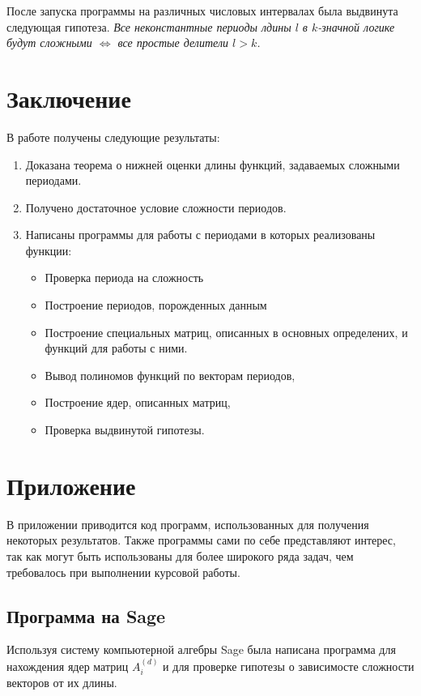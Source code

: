 \documentclass[bibliography=totoc, a4paper, 14pt]{extarticle}
\let\stdsection\section
\renewcommand\section{\newpage\stdsection}
\begin{document}
После запуска программы на различных числовых интервалах была выдвинута следующая гипотеза.
\emph{Все неконстантные периоды лдины $l$ в $k$\nobreakdash-значной логике будут сложными $\Leftrightarrow$
все простые делители $l > k$.}

\section{Заключение}
В работе получены следующие результаты:
\begin{enumerate}
\item Доказана теорема о нижней оценки длины функций, задаваемых сложными периодами.

\item Получено достаточное условие сложности периодов.

\item Написаны программы для работы с периодами в которых реализованы функции:
\begin{itemize}
\item Проверка периода на сложность
\item Построение периодов, порожденных данным
\item Построение специальных матриц, описанных в основных определених,
и функций для работы с ними.
\item Вывод полиномов функций по векторам периодов,
\item Построение ядер, описанных матриц,
\item Проверка выдвинутой гипотезы.
\end{itemize}
\end{enumerate}


\section{Приложение}

В приложении приводится код программ, использованных для получения некоторых результатов. Также программы
сами по себе представляют интерес, так как могут быть использованы для более широкого ряда задач,
чем требовалось при выполнении курсовой работы.

\subsection{Программа на Sage} \label{sub:sage}
Используя систему компьютерной алгебры {S}age\cite{sage} была написана программа для нахождения
ядер матриц $A_i^{(d)}$ и для проверке гипотезы о зависимосте сложности векторов от их длины.
\end{document}
